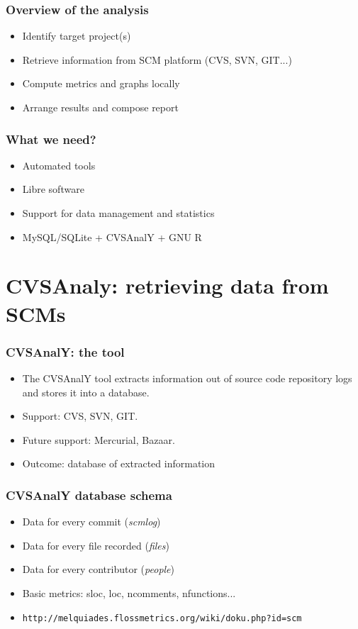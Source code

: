 \documentclass{beamer}
\begin{document}
\begin{frame}
 \frametitle{Overview of the analysis}
 \begin{itemize}
 \item Identify target project(s)
 \item Retrieve information from SCM platform (CVS, SVN, GIT...)
 \item Compute metrics and graphs locally
 \item Arrange results and compose report
 \end{itemize}
\end{frame}

\begin{frame}
 \frametitle{What we need?}
 \begin{itemize}
 \item Automated tools
 \item Libre software
 \item Support for data management and statistics
 \item MySQL/SQLite + CVSAnalY + GNU R
 \end{itemize}
\end{frame}

\section{CVSAnaly: retrieving data from SCMs}

\begin{frame}
 \frametitle{CVSAnalY: the tool}
 \begin{itemize}
 \item The CVSAnalY tool extracts information out of source 
code repository logs and stores it into a database.
 \item Support: CVS, SVN, GIT.
 \item Future support: Mercurial, Bazaar.
 \item Outcome: database of extracted information
 \end{itemize}
\end{frame}

\begin{frame}
\frametitle{CVSAnalY database schema}
 \begin{itemize}
 \item Data for every commit (\textit{scmlog})
 \item Data for every file recorded (\textit{files})
 \item Data for every contributor (\textit{people})
 \item Basic metrics: sloc, loc, ncomments, nfunctions...
 \item \texttt{\footnotesize http://melquiades.flossmetrics.org/wiki/doku.php?id=scm}
 \end{itemize}
\end{frame}
% 
\end{document}
